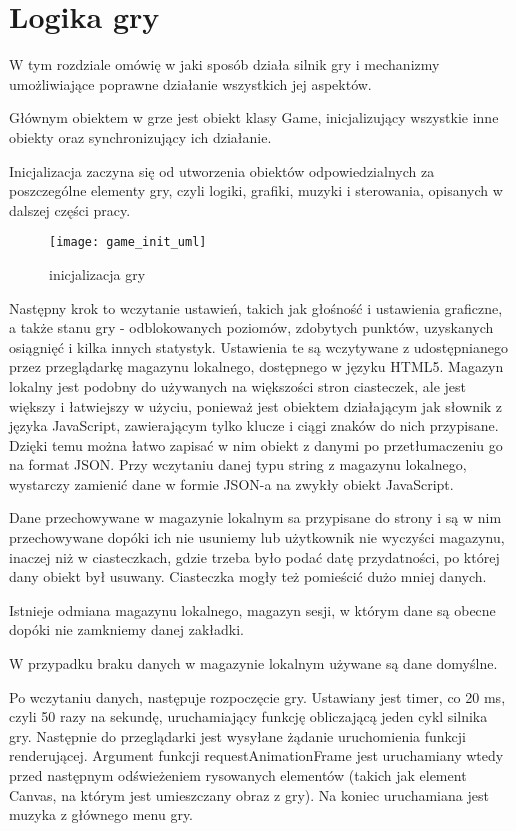 \chapter{Logika gry}
\thispagestyle{chapterBeginStyle}
\label{ch:logic}

\smallskip

W tym rozdziale omówię w jaki sposób działa silnik gry i mechanizmy umożliwiające poprawne działanie wszystkich jej aspektów.

Głównym obiektem w grze jest obiekt klasy Game, inicjalizujący wszystkie inne obiekty oraz synchronizujący ich działanie.

Inicjalizacja zaczyna się od utworzenia obiektów odpowiedzialnych za poszczególne elementy gry, czyli logiki, grafiki, muzyki i sterowania, opisanych w dalszej czę\'sci pracy.

\begin{wrapfigure}{l}{0.39\textwidth}
	\centering
	\noindent\texttt{[image: game\_init\_uml]}
	\caption{inicjalizacja gry}
\end{wrapfigure}
Następny krok to wczytanie ustawień, takich jak gło\'sno\'sć i ustawienia graficzne, a także stanu gry - odblokowanych poziomów, zdobytych punktów, uzyskanych osiągnięć i kilka innych statystyk. Ustawienia te są wczytywane z udostępnianego przez przeglądarkę magazynu lokalnego, dostępnego w języku HTML5. Magazyn lokalny jest podobny do używanych na większo\'sci stron ciasteczek, ale jest większy i łatwiejszy w użyciu, ponieważ jest obiektem działającym jak słownik z języka JavaScript, zawierającym tylko klucze i ciągi znaków do nich przypisane. Dzięki temu można łatwo zapisać w nim obiekt z danymi po przetłumaczeniu go na format JSON. Przy wczytaniu danej typu string z magazynu lokalnego, wystarczy zamienić dane w formie JSON-a na zwykły obiekt JavaScript.

Dane przechowywane w magazynie lokalnym sa przypisane do strony i są w nim przechowywane dopóki ich nie usuniemy lub użytkownik nie wyczy\'sci magazynu, inaczej niż w ciasteczkach, gdzie trzeba było podać datę przydatno\'sci, po której dany obiekt był usuwany. Ciasteczka mogły też pomie\'scić dużo mniej danych.

Istnieje odmiana magazynu lokalnego, magazyn sesji, w którym dane są obecne dopóki nie zamkniemy danej zakładki.

W przypadku braku danych w magazynie lokalnym używane są dane domy\'slne.

Po wczytaniu danych, następuje rozpoczęcie gry. Ustawiany jest timer, co 20 ms, czyli 50 razy na sekundę, uruchamiający funkcję obliczającą jeden cykl silnika gry. Następnie do przeglądarki jest wysyłane żądanie uruchomienia funkcji renderującej. Argument funkcji requestAnimationFrame jest uruchamiany wtedy przed następnym od\'swieżeniem rysowanych elementów (takich jak element Canvas, na którym jest umieszczany obraz z gry). Na koniec uruchamiana jest muzyka z głównego menu gry.

